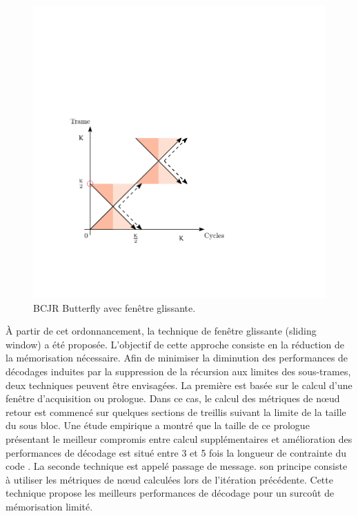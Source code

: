 \begin{figure}[!h]
	\centering
	\includegraphics{main/ch4_fig/ipe/BFLY_SW.pdf}
	\caption{BCJR Butterfly avec fenêtre glissante. \label{fig:siso_bf_sw}}
\end{figure}

À partir de cet ordonnancement, la technique de fenêtre glissante (sliding window) a été proposée. L'objectif de cette 
approche consiste en la réduction de la mémorisation nécessaire. Afin de minimiser la diminution des performances 
de décodages induites par la suppression de la récursion aux limites des sous-trames, deux techniques peuvent être 
envisagées. La première est basée sur le calcul d'une fenêtre d'acquisition ou prologue. Dans ce cas, le calcul des 
métriques de nœud retour est commencé sur quelques sections de treillis suivant la limite de la taille du sous bloc. 
Une étude empirique a montré que la taille de ce prologue présentant le meilleur compromis entre calcul supplémentaires
et amélioration des performances de décodage est situé entre 3 et 5 fois la longueur de contrainte du code \cite{sw_init}.
La seconde technique est appelé passage de message. son principe consiste à utiliser les métriques de nœud calculées 
lors de l'itération précédente. Cette technique propose les meilleurs performances de décodage pour un surcoût de
mémorisation limité.

